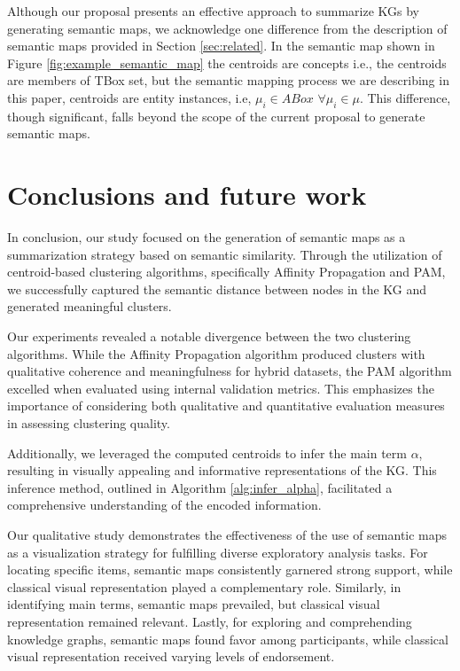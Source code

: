 \documentclass{ieeeaccess}
\begin{document}
Although our proposal presents an effective 
approach to summarize KGs by generating semantic
maps, we acknowledge one difference 
from the description of semantic maps provided in Section
\ref{sec:related}. In the semantic map shown in 
Figure \ref{fig:example_semantic_map} the centroids
are concepts i.e., the centroids are members of TBox set,
but the semantic mapping process we are describing
in this paper, centroids are entity instances, i.e, 
$\mu_{i} \in ABox$ $\forall \mu_{i} \in \mu$. This
difference, though significant, falls beyond the
scope of the current proposal to generate
semantic maps.

\section{Conclusions and future work}
\label{sec:conclusions}

In conclusion, our study focused on the generation 
of semantic maps as a summarization strategy based
on semantic similarity. Through the utilization
of centroid-based clustering
algorithms, specifically Affinity Propagation and PAM, 
we successfully captured the semantic distance between 
nodes in the KG and generated meaningful clusters.

Our experiments revealed a notable divergence 
between the two clustering algorithms. While the 
Affinity Propagation algorithm produced clusters 
with qualitative coherence and meaningfulness for
hybrid datasets, the PAM algorithm excelled when 
evaluated using internal validation metrics. This 
emphasizes the importance of considering both 
qualitative and quantitative evaluation measures
in assessing clustering quality.

Additionally, we leveraged the computed
centroids to infer the main term $\alpha$, 
resulting in visually appealing and informative
representations of the KG. This inference method,
outlined in Algorithm \ref{alg:infer_alpha}, 
facilitated a comprehensive understanding of
the encoded information.

Our qualitative study demonstrates the 
effectiveness of the use of semantic
maps as a visualization strategy for fulfilling 
diverse exploratory analysis tasks. For locating 
specific items, semantic maps consistently 
garnered strong support, while classical visual 
representation played a complementary role. 
Similarly, in identifying main terms, semantic 
maps prevailed, but classical visual 
representation remained relevant. Lastly, for 
exploring and comprehending knowledge graphs, 
semantic maps found favor among participants, 
while classical visual representation received 
varying levels of endorsement.
\end{document}

